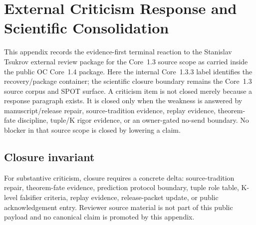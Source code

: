 \section{External Criticism Response and Scientific Consolidation}
\label{sec:oc13-external-criticism-closure}

This appendix records the evidence-first terminal reaction to the Stanislav Tsukrov external review package for the Core~1.3 source scope as carried inside the public OC Core~1.4 package. Here the internal Core~1.3.3 label identifies the recovery/package container; the scientific closure boundary remains the Core~1.3 source corpus and SPOT surface. A criticism item is not closed merely because a response paragraph exists. It is closed only when the weakness is answered by manuscript/release repair, source-tradition evidence, replay evidence, theorem-fate discipline, tuple/K rigor evidence, or an owner-gated no-send boundary. No blocker in that source scope is closed by lowering a claim.

\subsection{Closure invariant}

For substantive criticism, closure requires a concrete delta: source-tradition repair, theorem-fate evidence, prediction protocol boundary, tuple role table, K-level falsifier criteria, replay evidence, release-packet update, or public acknowledgement entry. Reviewer source material is not part of this public payload and no canonical claim is promoted by this appendix.

